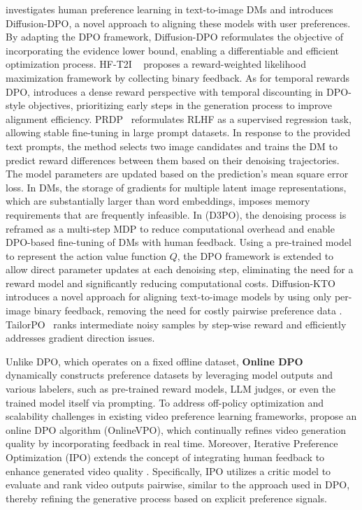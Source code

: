 \citet{wallace2024diffusion} investigates human preference learning in text-to-image DMs and introduces Diffusion-DPO, a novel approach to aligning these models with user preferences. By adapting the DPO framework, Diffusion-DPO reformulates the objective of incorporating the evidence lower bound, enabling a differentiable and efficient optimization process. HF-T2I ~\citep{lee2023aligning} proposes a reward-weighted likelihood maximization framework by collecting binary feedback. As for temporal rewards DPO, \citet{yang2024dense} introduces a dense reward perspective with temporal discounting in DPO-style objectives, prioritizing early steps in the generation process to improve alignment efficiency. PRDP~\citep{deng2024prdp} reformulates RLHF as a supervised regression task, allowing stable fine-tuning in large prompt datasets. In response to the provided text prompts, the method selects two image candidates and trains the DM to predict reward differences between them based on their denoising trajectories. The model parameters are updated based on the prediction's mean square error loss. In DMs, the storage of gradients for multiple latent image representations, which are substantially larger than word embeddings, imposes memory requirements that are frequently infeasible. In \citep{yang2024using} (D3PO), the denoising process is reframed as a multi-step MDP to reduce computational overhead and enable DPO-based fine-tuning of DMs with human feedback. Using a pre-trained model to represent the action value function  $Q$, the DPO framework is extended to allow direct parameter updates at each denoising step, eliminating the need for a reward model and significantly reducing computational costs. Diffusion-KTO introduces a novel approach for aligning text-to-image models by using only per-image binary feedback, removing the need for costly pairwise preference data \citep{li2024aligningdiffusionmodelsoptimizing}. TailorPO~\citep{ren2025refiningalignmentframeworkdiffusion} ranks intermediate noisy samples by step-wise reward and efficiently addresses gradient direction issues.

Unlike DPO, which operates on a fixed offline dataset, \textbf{Online DPO} dynamically constructs preference datasets by leveraging model outputs and various labelers, such as pre-trained reward models, LLM judges, or even the trained model itself via prompting. To address off-policy optimization and scalability challenges in existing video preference learning frameworks, \citet{zhang2024onlinevpoalignvideodiffusion} propose an online DPO algorithm (OnlineVPO), which continually refines video generation quality by incorporating feedback in real time. Moreover, Iterative Preference Optimization (IPO) extends the concept of integrating human feedback to enhance generated video quality \citep{yang2025ipoiterativepreferenceoptimization}. Specifically, IPO utilizes a critic model to evaluate and rank video outputs pairwise, similar to the approach used in DPO, thereby refining the generative process based on explicit preference signals.  

